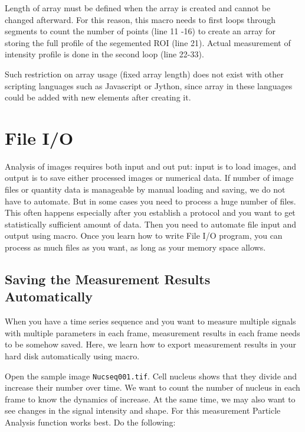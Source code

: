 \documentclass[11pt,a4paper,oneside]{report}
\newcommand{\ilcom}[1]{\texttt{\small#1}}
\begin{document}
Length of array must be defined when the array is created and cannot be changed afterward. For this reason, this macro needs to first loops through segments to count the number of points (line 11 -16) to create an array for storing the full profile of the segemented ROI (line 21). Actual measurement of intensity profile is done in the second loop (line 22-33).

Such restriction on array usage (fixed array length) does not exist with other scripting languages such as Javascript or Jython, since array in these languages could be added with new elements after creating it. 

\newpage

\section{File I/O}

Analysis of images requires both input and out put: input is to load images, and output is  to save either processed images or numerical data. If number of image files or quantity data is manageable by manual loading and saving, we do not have to automate. But in some cases you need to process a huge number of files. This often happens especially after you establish a protocol and you want to get statistically sufficient amount of data. Then you need to automate file input and output using macro. Once you learn how to write File I/O program, you can process as much files as you want, as long as your memory space allows.

\subsection{Saving the Measurement Results Automatically}

When you have a time series sequence and you want to measure multiple signals with multiple parameters in each frame, measurement results in each frame needs to be somehow saved. Here, we learn how to export measurement results in your hard disk automatically using macro. 

Open the sample image \ilcom{Nucseq001.tif}. Cell nucleus shows that they divide and increase their number over time. We want to count the number of nucleus in each frame to know the dynamics of increase. At the same time, we may also want to see changes in the signal intensity and shape. For this measurement Particle Analysis function works best. Do the following:
\end{document}
